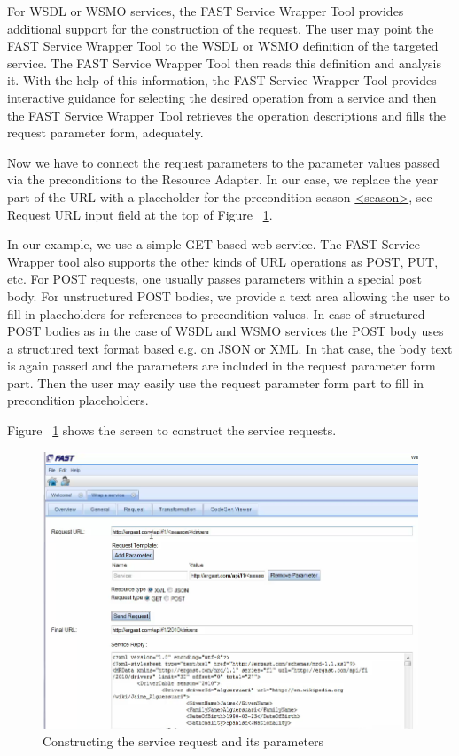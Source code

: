 \documentclass{article}
\begin{document}
For WSDL or WSMO services, the FAST Service Wrapper Tool provides additional support for the construction of the request. The user may point the FAST Service Wrapper Tool to the WSDL or WSMO definition of the targeted service. The FAST Service Wrapper Tool then reads this definition and analysis it. With the help of this information, the FAST Service Wrapper Tool provides interactive guidance for selecting the desired operation from a service and then the FAST Service Wrapper Tool retrieves the operation descriptions and fills the request parameter form, adequately. 

Now we have to connect the request parameters to the parameter values passed via the preconditions to the Resource Adapter. In our case, we replace the year part of the URL with a placeholder for the precondition season \url{<season>}, see Request URL input field at the top of Figure ~\ref{fig:construct_service_request}.  

In our example, we use a simple GET based web service. The FAST Service Wrapper tool also supports the other kinds of URL operations as POST, PUT, etc. For POST requests, one usually passes parameters within a special post body. For unstructured POST bodies, we provide a text area allowing the user to fill in placeholders for references to precondition values. In case of structured POST bodies as in the case of WSDL and WSMO services the POST body uses a structured text format based e.g. on JSON or XML. In that case, the body text is again passed and the parameters are included in the request parameter form part. Then the user may easily use the request parameter form part to fill in precondition placeholders. 


Figure ~\ref{fig:construct_service_request} shows the screen to construct the service requests.

\begin{figure}
  \begin{center}
    \includegraphics[width=\linewidth]{images/ServiceWrapperToolGVSRequestTemplate.png}
    \caption{Constructing the service request and its parameters}
    \label{fig:construct_service_request}
  \end{center}
\end{figure}
\end{document}
